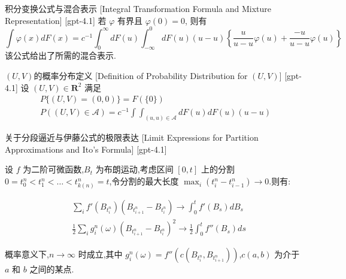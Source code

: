 \documentclass[UTF8]{ctexart}
\begin{document}
    
    
    \begin{thm}
        {积分变换公式与混合表示}
        [Integral Transformation Formula and Mixture Representation]
        [gpt-4.1]
        若 $\varphi$ 有界且 $\varphi(0) = 0$, 则有
\[
\int \varphi(x) dF(x) = c^{-1} \int_0^{\infty} dF(
u) \int_{-\infty}^0 dF(u) (
u - u) \left\{ \frac{
u}{
u - u} \varphi(u) + \frac{-u}{
u - u} \varphi(
u) \right\}
\]
该公式给出了所需的混合表示.

    \end{thm}
    
    
    
    \begin{dfn}
        {$(U, V)$的概率分布定义}
        [Definition of Probability Distribution for $(U, V)$]
        [gpt-4.1]
        设 $(U, V) \in \mathbf{R}^2$ 满足
\[
\begin{array}{l}
P\{(U, V) = (0, 0)\} = F(\{0\}) \\
P((U, V) \in \mathcal{A}) = c^{-1} \int \int_{(u, 
u) \in \mathcal{A}} dF(u) dF(
u) (
u - u)
\end{array}
\]

    \end{dfn}
    
    
    
    \begin{thm}
        {关于分段逼近与伊藤公式的极限表达}
        [Limit Expressions for Partition Approximations and Ito's Formula]
        [gpt-4.1]
        
设 $f$ 为二阶可微函数,$B_t$ 为布朗运动,考虑区间 $[0,t]$ 上的分割 $0 = t_{0}^{n} < t_{1}^{n} < \ldots < t_{k(n)}^{n} = t$,令分割的最大长度 $\max_{i} (t_{i}^{n} - t_{i-1}^{n}) \to 0$.则有:

\[
\begin{array}{rl}
& \displaystyle\sum_{i} f'(B_{t_{i}^{n}}) (B_{t_{i+1}^{n}} - B_{t_{i}^{n}}) \to \int_{0}^{t} f'(B_{s}) dB_{s} \\
& \displaystyle\frac{1}{2} \sum_{i} g_{i}^{n}(\omega) (B_{t_{i+1}^{n}} - B_{t_{i}^{n}})^{2} \to \frac{1}{2} \int_{0}^{t} f''(B_{s}) ds
\end{array}
\]

概率意义下,$n \to \infty$ 时成立,其中 $g_{i}^{n}(\omega) = f''(c(B_{t_{i}^{n}}, B_{t_{i+1}^{n}}))$,$c(a, b)$ 为介于 $a$ 和 $b$ 之间的某点.

    \end{thm}
    
\end{document}
